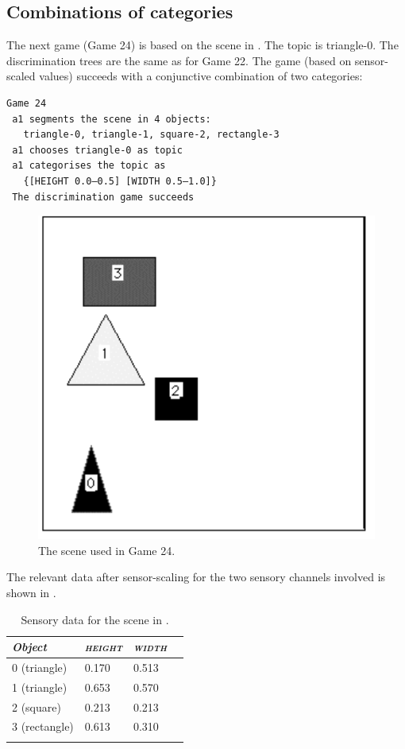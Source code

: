 \subsection{Combinations of categories}

The next game (Game 24) is based on the scene in 
. The topic is triangle-0. 
The discrimination trees are the same as for
Game 22. The game (based on sensor-scaled values)
succeeds with a conjunctive combination of two
categories: 
\begin{verbatim}
Game 24
 a1 segments the scene in 4 objects: 
   triangle-0, triangle-1, square-2, rectangle-3 
 a1 chooses triangle-0 as topic
 a1 categorises the topic as 
   {[HEIGHT 0.0–0.5] [WIDTH 0.5–1.0]}
 The discrimination game succeeds
\end{verbatim}

\begin{figure}[htbp]
  \centerline{\includegraphics[width=.40\textwidth]{chap4/figs/game24.pdf}}
\caption{\label{scene4}The scene used in Game 24.}
\end{figure}
The relevant data after sensor-scaling for the 
two sensory channels involved is shown in . 

\begin{table}
\begin{center}
\begin{tabular}{ l  l  l  l }
\lsptoprule
{\itshape Object} & {\itshape \textsc{height}} & {\itshape \textsc{width}} \\ \midrule
0 (triangle) & 0.170 & 0.513  \\ 
1 (triangle) & 0.653 & 0.570 \\  
2 (square) & 0.213 & 0.213 \\  
3 (rectangle) & 0.613 & 0.310 \\  
\lspbottomrule
\end{tabular}
\caption{\label{tab:t-game24}Sensory data for the scene in .}
\end{center}
\end{table}

